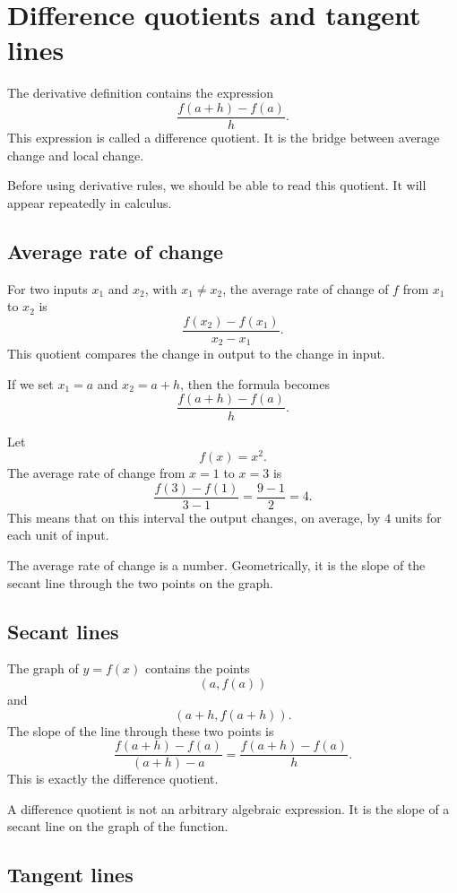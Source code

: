 \section{Difference quotients and tangent lines}

The derivative definition contains the expression
\[
\frac{f(a+h)-f(a)}{h}.
\]
This expression is called a difference quotient. It is the bridge between average change and local change.

Before using derivative rules, we should be able to read this quotient. It will appear repeatedly in calculus.

\subsection*{Average rate of change}

For two inputs \(x_1\) and \(x_2\), with \(x_1\ne x_2\), the average rate of change of \(f\) from \(x_1\) to \(x_2\) is
\[
\frac{f(x_2)-f(x_1)}{x_2-x_1}.
\]
This quotient compares the change in output to the change in input.

If we set \(x_1=a\) and \(x_2=a+h\), then the formula becomes
\[
\frac{f(a+h)-f(a)}{h}.
\]

\begin{examplebox}
Let
\[
f(x)=x^2.
\]
The average rate of change from \(x=1\) to \(x=3\) is
\[
\frac{f(3)-f(1)}{3-1}
=
\frac{9-1}{2}=4.
\]
This means that on this interval the output changes, on average, by \(4\) units for each unit of input.
\end{examplebox}

The average rate of change is a number. Geometrically, it is the slope of the secant line through the two points on the graph.

\subsection*{Secant lines}

The graph of \(y=f(x)\) contains the points
\[
(a,f(a))
\]
and
\[
(a+h,f(a+h)).
\]
The slope of the line through these two points is
\[
\frac{f(a+h)-f(a)}{(a+h)-a}
=
\frac{f(a+h)-f(a)}{h}.
\]
This is exactly the difference quotient.

\begin{remarkbox}
A difference quotient is not an arbitrary algebraic expression. It is the slope of a secant line on the graph of the function.
\end{remarkbox}

\subsection*{Tangent lines}

